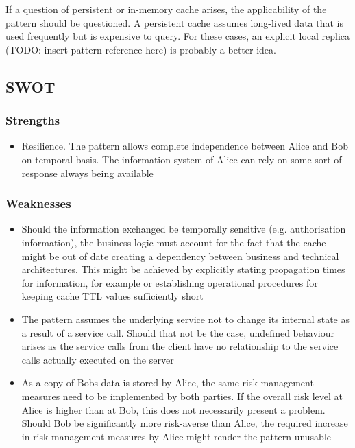 \documentclass[10pt,a4paper]{article}
\begin{document}
If a question of persistent or in-memory cache arises, the applicability of the pattern should be questioned. A persistent cache assumes long-lived data that is used frequently but is expensive to query. For these cases, an explicit local replica (TODO: insert pattern reference here) is probably a better idea.

\subsection{SWOT}
\subsubsection{Strengths}
	\begin{itemize}
 		\item Resilience. The pattern allows complete independence between Alice and Bob on temporal basis. The information system of Alice can rely on some sort of response always being available  
	\end{itemize}
	
\subsubsection{Weaknesses}	
	 	\begin{itemize}
			\item Should the information exchanged be temporally sensitive (e.g. authorisation information), the business logic must account for the fact that the cache might be out of date creating a dependency between business and technical architectures. This might be achieved by explicitly stating propagation times for information, for example or establishing operational procedures for keeping cache TTL values sufficiently short 
			\item The pattern assumes the underlying service not to change its internal state as a result of a service call. Should that not be the case, undefined behaviour arises as the service calls from the client have no relationship to the service calls actually executed on the server
			\item As a copy of Bobs data is stored by Alice, the same risk management measures need to be implemented by both parties. If the overall risk level at Alice is higher than at Bob, this does not necessarily present a problem. Should Bob be significantly more risk-averse than Alice, the required increase in risk management measures by Alice might render the pattern unusable
		\end{itemize}
\end{document}
